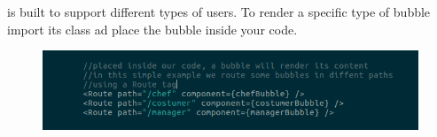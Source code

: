 \subsubsection{\DemoName{}}
\DemoName{} is built to support different types of users. To render a specific type of bubble import its class ad place the bubble inside your code.  
\begin{figure}[H]
	\centering
	\includegraphics[width=14cm]{../../documenti/UserManualFramework/framework_view/21framework_view_demo.png}
	\caption{\DemoName{}}
\end{figure}

